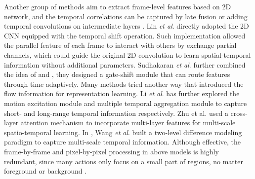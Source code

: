 \documentclass[journal]{IEEEtran}
\newcommand{\etal}{\textit{et al}. }
\begin{document}
Another group of methods aim to extract frame-level features based on 2D network, and the temporal correlations can be captured by late fusion \cite{wang2016temporal} or adding temporal convolutions on intermediate layers \cite{lin2019tsm,li2020tea,jiang2019stm,sudhakaran2020gate}.
Lin \etal \cite{lin2019tsm} directly adopted the 2D CNN equipped with the temporal shift operation.
Such implementation allowed the parallel feature of each frame to interact with others by exchange partial channels, which could guide the original 2D convolution to learn spatial-temporal information without additional parameters.
Sudhakaran \etal \cite{sudhakaran2020gate} further combined the idea of \cite{lin2019tsm} and \cite{luo2019grouped}, they designed a gate-shift module that can route features through time adaptively.
Many methods tried another way that introduced the flow information for representation learning.
Li \etal \cite{li2020tea} has further explored the motion excitation module and multiple temporal aggregation module to capture short- and long-range temporal information respectively.
Zhu et al. \cite{zhu2021temporal} used a cross-layer attention mechanism to incorporate multi-layer features for multi-scale spatio-temporal learning. 
In \cite{wang2021tdn}, Wang \etal built a two-level difference modeling paradigm to capture multi-scale temporal information.
Although effective, the frame-by-frame and pixel-by-pixel processing in above models is highly redundant, since many actions only focus on a small part of regions, no matter foreground or background \cite{yue2018compact, zeng2019graph}.
\end{document}
